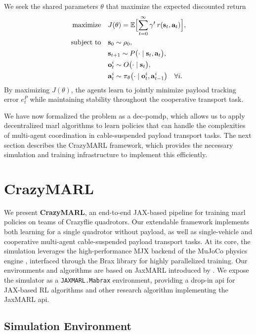 We seek the shared parameters \(\theta\) that maximize the expected discounted return
\begin{equation}
\begin{aligned}
\text{maximize}\quad & J(\theta) = \mathbb{E}\Bigl[\sum_{t=0}^\infty \gamma^t\,r(\mathbf{s}_t,\mathbf{a}_t)\Bigr],\\
\text{subject to}\quad &\mathbf{s}_0 \sim \rho_0,\\
&\mathbf{s}_{t+1} \sim P\bigl(\cdot\mid \mathbf{s}_t,\mathbf{a}_t\bigr),\\
&\mathbf{o}^i_t \sim O\bigl(\cdot\mid \mathbf{s}_t\bigr),\\
&\mathbf{a}^i_t \sim \pi_{\theta}\bigl(\cdot\mid \mathbf{o}^i_t,\mathbf{a}^i_{t-1}\bigr)
\quad\forall i.
\end{aligned}
\end{equation}
By maximizing \(J(\theta)\), the agents learn to jointly minimize payload tracking error \(e^P_t\) while maintaining stability throughout the cooperative transport task.

We have now formalized the problem as a \gls{dec-pomdp}, which allows us to apply decentralized \gls{marl} algorithms to learn policies that can handle the complexities of multi-agent coordination in cable-suspended payload transport tasks. The next section describes the CrazyMARL framework, which provides the necessary simulation and training infrastructure to implement this efficiently.

\section{CrazyMARL}
We present \textbf{CrazyMARL}, an end-to-end JAX-based pipeline for training \gls{marl} policies on teams of Crazyflie quadrotors. Our extendable framework implements both learning for a single quadrotor without payload, as well as single-vehicle and cooperative multi-agent cable-suspended payload transport tasks. At its core, the simulation leverages the high-performance MJX backend of the MuJoCo physics engine \cite{todorov2012mujoco}, interfaced through the Brax library for highly parallelized training. Our environments and algorithms are based on JaxMARL introduced by \autocite{flair2023jaxmarl}. We expose the simulator as a \texttt{JAXMARL.Mabrax} environment, providing a drop-in \gls{api} for JAX-based RL algorithms and other research algorithm implementing the JaxMARL api.

\subsection{Simulation Environment}

